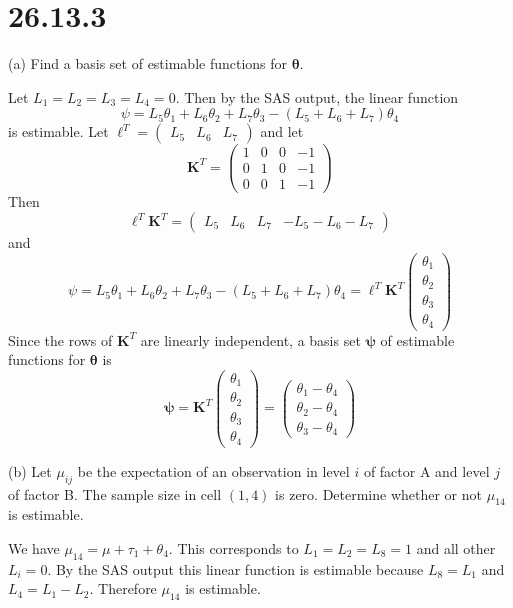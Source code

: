 \section*{26.13.3}
(a) Find a basis set of estimable functions for $\bm\theta$.

\bigskip
\noindent
Let $L_1=L_2=L_3=L_4=0$.
Then by the SAS output, the linear function
\[
\psi=L_5\theta_1+L_6\theta_2+L_7\theta_3-(L_5+L_6+L_7)\theta_4
\] is estimable.
Let $\bm\ell^T=\begin{pmatrix}
L_5 & L_6 & L_7\end{pmatrix}$ and let
\[
\mathbf K^T=
\begin{pmatrix}
1 & 0 & 0 & -1\\
0 & 1 & 0 & -1\\
0 & 0 & 1 & -1
\end{pmatrix}
\]
Then
\[
\bm\ell^T\mathbf K^T=
\begin{pmatrix}
L_5 & L_6 & L_7 & -L_5-L_6-L_7
\end{pmatrix}
\]
and
\[
\psi=L_5\theta_1+L_6\theta_2+L_7\theta_3-(L_5+L_6+L_7)\theta_4=
\bm\ell^T\mathbf K^T
\begin{pmatrix}
\theta_1\\
\theta_2\\
\theta_3\\
\theta_4
\end{pmatrix}
\]
Since the rows of $\mathbf K^T$ are linearly independent,
a basis set $\bm\psi$ of estimable functions for $\bm\theta$ is
\[
\bm\psi=
\mathbf K^T
\begin{pmatrix}
\theta_1\\
\theta_2\\
\theta_3\\
\theta_4
\end{pmatrix}
=\begin{pmatrix}
\theta_1-\theta_4\\
\theta_2-\theta_4\\
\theta_3-\theta_4
\end{pmatrix}
\]

\bigskip
\noindent
(b) Let $\mu_{ij}$ be the expectation of an observation in level
$i$ of factor A and level $j$ of factor B.
The sample size in cell $(1,4)$ is zero.
Determine whether or not $\mu_{14}$ is estimable.

\bigskip
\noindent
We have $\mu_{14}=\mu+\tau_1+\theta_4$.
This corresponds to $L_1=L_2=L_8=1$ and all other $L_i=0$.
By the SAS output this linear function is estimable because
$L_8=L_1$ and $L_4=L_1-L_2$. Therefore $\mu_{14}$ is estimable.
